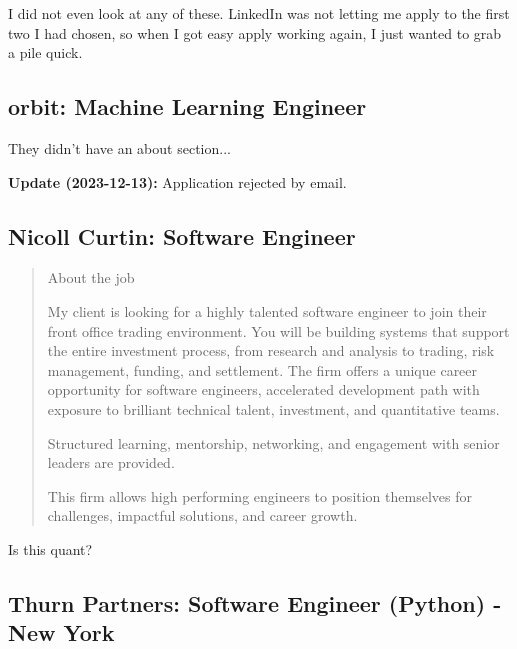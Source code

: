 \documentclass[
	letterpaper, %
	12pt, %
]{CSSullivanBusinessReport}
\begin{document}
I did not even look at any of these. LinkedIn was not letting me apply to the first two I had chosen, so when I got easy apply working again, I just wanted to grab a pile quick. 


\subsection[orbit]{orbit: Machine Learning Engineer}

They didn't have an about section...

\textbf{Update (2023-12-13):} Application rejected by email.


\subsection[Nicoll Curtin]{Nicoll Curtin: Software Engineer}

\begin{quote}
	About the job
	
	My client is looking for a highly talented software engineer to join their front office trading environment. You will be building systems that support the entire investment process, from research and analysis to trading, risk management, funding, and settlement. The firm offers a unique career opportunity for software engineers, accelerated development path with exposure to brilliant technical talent, investment, and quantitative teams.

	Structured learning, mentorship, networking, and engagement with senior leaders are provided.

	This firm allows high performing engineers to position themselves for challenges, impactful solutions, and career growth. 

\end{quote}

Is this quant?


\subsection[Thurn Partners]{Thurn Partners: Software Engineer (Python) - New York}
\end{document}
